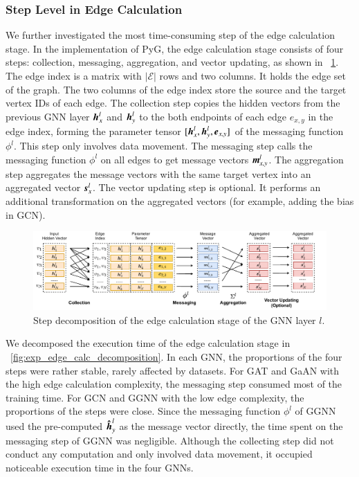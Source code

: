 \subsubsection{Step Level in Edge Calculation}

We further investigated the most time-consuming step of the edge calculation stage.
%
In the implementation of PyG, the edge calculation stage consists of four steps: collection, messaging, aggregation, and vector updating, as shown in \figurename~\ref{fig:steps_in_edge_calculation}.
%
The edge index is a matrix with $|\mathcal{E}|$ rows and two columns.
%
It holds the edge set of the graph.
%
The two columns of the edge index store the source and the target vertex IDs of each edge.
%
The collection step copies the hidden vectors from the previous GNN layer $\boldsymbol{h}^l_x$ and $\boldsymbol{h}^l_y$ to the both endpoints of each edge $e_{x,y}$ in the edge index, forming the parameter tensor $[\boldsymbol{h}^l_x, \boldsymbol{h}^l_{y}, \boldsymbol{e}_{x,y}]$ of the messaging function $\phi^l$.
%
This step only involves data movement.
%
The messaging step calls the messaging function $\phi^l$ on all edges to get message vectors $\boldsymbol{m}^l_{x,y}$.
%
The aggregation step aggregates the message vectors with the same target vertex into an aggregated vector $\boldsymbol{s}^l_x$.
%
The vector updating step is optional.
%
It performs an additional transformation on the aggregated vectors (for example, adding the bias in GCN).

\begin{figure}[H]
    \centering
    \includegraphics[width=1\columnwidth]{figs/illustration/steps_in_edge_calculation.pdf}
    \caption{Step decomposition of the edge calculation stage of the GNN layer $l$.}
    \label{fig:steps_in_edge_calculation}
\end{figure}

We decomposed the execution time of the edge calculation stage in \figurename~\ref{fig:exp_edge_calc_decomposition}.
%
In each GNN, the proportions of the four steps were rather stable, rarely affected by datasets. 
%
For GAT and GaAN with the high edge calculation complexity, the messaging step consumed most of the training time. 
%
For GCN and GGNN with the low edge complexity, the proportions of the steps were close. 
%
Since the messaging function $\phi^l$ of GGNN used the pre-computed $\boldsymbol{\hat{h}}^l_y$ as the message vector directly, the time spent on the messaging step of GGNN was negligible.
%
Although the collecting step did not conduct any computation and only involved data movement, it occupied noticeable execution time in the four GNNs.

